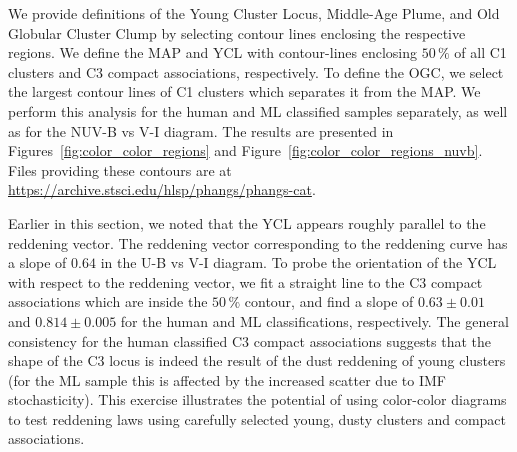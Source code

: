 \documentclass[linenumbers]{aastex63}
\begin{document}

We provide definitions of the Young Cluster Locus, Middle-Age Plume, and Old Globular Cluster Clump by selecting contour lines enclosing the respective regions.
We define the MAP and YCL with contour-lines enclosing $50\,\%$ of all C1 clusters and C3 compact associations, respectively. 
To define the OGC, we select the largest contour lines of C1 clusters which separates it from the MAP. %
We perform this analysis for the human and ML classified samples separately, as well as for the NUV-B vs V-I diagram.  The results are presented in  Figures~\ref{fig:color_color_regions} and Figure~\ref{fig:color_color_regions_nuvb}. %
Files providing these contours are at \url{https://archive.stsci.edu/hlsp/phangs/phangs-cat}.

Earlier in this section, we noted that the YCL appears roughly parallel to the reddening vector.
The reddening vector corresponding to the \citet{cardelli_relationship_1989} reddening curve has a slope of $0.64$ in the U-B vs V-I diagram.
To probe the orientation of the YCL with respect to the reddening vector, we fit a straight line to the C3 compact associations which are inside the $50\,\%$ contour, and find a slope of $0.63\pm0.01$ and $0.814\pm0.005$ for the human and ML classifications, respectively. 
The general consistency for the human classified C3 compact associations suggests that the shape of the C3 locus is indeed the result of the dust reddening of young clusters (for the ML sample this is affected by the increased scatter due to IMF stochasticity). %
This exercise illustrates the potential of using color-color diagrams to test reddening laws using carefully selected young, dusty clusters and compact associations. 
\end{document}
